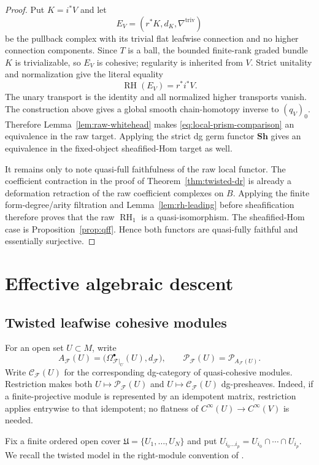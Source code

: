 \documentclass[12pt]{amsart}
\theoremstyle{definition}
\theoremstyle{remark}
\numberwithin{equation}{section}
\newcommand{\CF}{{\mathcal F}}
\newcommand{\A}{{A}}
\newcommand{\1}{{\mathbb{1}}}
\newcommand{\RH}{\operatorname{RH}}
\begin{document}
\begin{proof}
Put $K=i^*V$ and let
\[
 E_V=(r^*K,d_K,\nabla^{\mathrm{triv}})
\]
be the pullback complex with its trivial flat leafwise connection and
no higher connection components.  Since $T$ is a ball, the bounded
finite-rank graded bundle $K$ is trivializable, so $E_V$ is cohesive;
regularity is inherited from $V$.  Strict unitality and normalization
give the literal equality
\[
 \RH(E_V)=r^*i^*V.
\]
The unary transport is the identity and all normalized higher
transports vanish.  The construction above gives a global smooth
chain-homotopy inverse to $(q_V)_0$.  Therefore
Lemma~\ref{lem:raw-whitehead} makes
\eqref{eq:local-prism-comparison} an equivalence in the raw target.
Applying the strict dg germ functor $\mathbf{Sh}$ gives an equivalence
in the fixed-object sheafified-Hom target as well.

It remains only to note quasi-full faithfulness of the raw local
functor.  The coefficient contraction in the proof of
Theorem~\ref{thm:twisted-dr} is already a deformation retraction of
the raw coefficient complexes on $B$.  Applying the finite
form-degree/arity filtration and
Lemma~\ref{lem:rh-leading} before sheafification therefore proves that
the raw $\RH_1$ is a quasi-isomorphism.  The sheafified-Hom case is
Proposition~\ref{prop:qff}.  Hence both functors are quasi-fully
faithful and essentially surjective.
\end{proof}

\section{Effective algebraic descent}
\label{sec:cohesive-descent}

\subsection{Twisted leafwise cohesive modules}

For an open set $U\subset M$, write
\[
 \A_{\CF}(U)
 =
 \bigl(\Omega^\bullet_{\CF|_U}(U),d_{\CF}\bigr),
 \qquad
 \mathcal P_{\CF}(U)=\mathcal P_{\A_{\CF}(U)}.
\]
Write $\mathcal C_{\CF}(U)$ for the corresponding dg-category of
quasi-cohesive modules.  Restriction makes both
$U\mapsto\mathcal P_{\CF}(U)$ and
$U\mapsto\mathcal C_{\CF}(U)$ dg-presheaves.
Indeed, if a finite-projective module is represented by an idempotent
matrix, restriction applies entrywise to that idempotent; no flatness
of $C^\infty(U)\to C^\infty(V)$ is needed.

Fix a finite ordered open cover
$\mathfrak U=\{U_1,\ldots,U_N\}$ and put
$U_{i_0\ldots i_p}=U_{i_0}\cap\cdots\cap U_{i_p}$.
We recall the twisted model in the right-module convention of
\cite{BHW17,Wei23}.
\end{document}
